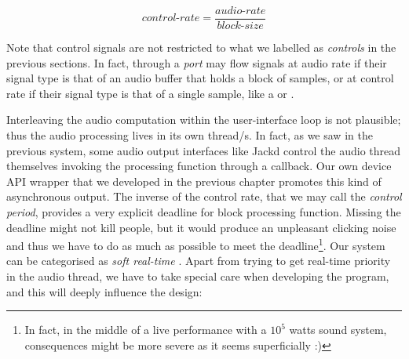 \begin{equation}
  control\mbox{-}rate = \frac{audio\mbox{-}rate}{block\mbox{-}size}  
\end{equation}

Note that control signals are not restricted to what we labelled as
\emph{controls} in the previous sections. In fact, through a
\emph{port} may flow signals at audio rate if their signal type is
that of an audio buffer that holds a block of samples, or at control
rate if their signal type is that of a single sample, like a
 or .

Interleaving the audio computation within the user-interface loop is
not plausible; thus the audio processing lives in its own thread/s. In
fact, as we saw in the previous system, some audio output interfaces
like Jackd control the audio thread themselves invoking the processing
function through a callback. Our own device API wrapper that we
developed in the previous chapter promotes this kind of asynchronous
output. The inverse of the control rate, that we may call the
\emph{control period}, provides a very explicit deadline for block
processing function. Missing the deadline might not kill people, but
it would produce an unpleasant clicking noise and thus we have to do
as much as possible to meet the deadline\footnote{In fact, in the
  middle of a live performance with a $10^5$ watts sound system,
  consequences might be more severe as it seems superficially :)}. Our
system can be categorised as \emph{soft real-time}
\cite{tanenbaum07mos}. Apart from trying to get real-time
priority in the audio thread, we have to take special care when
developing the program, and this will deeply influence the design:

